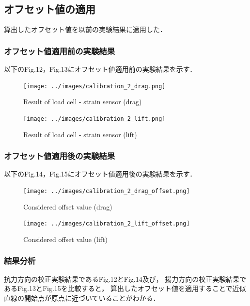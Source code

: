 \documentclass[twocolumn,a4j]{jsarticle}
\begin{document}

\subsection{オフセット値の適用}
算出したオフセット値を以前の実験結果に適用した．\\

\subsubsection*{オフセット値適用前の実験結果}
以下のFig.12，Fig.13にオフセット値適用前の実験結果を示す．
\begin{figure}[htbp]
    \footnotesize
    \begin{center}
        \texttt{[image: ../images/calibration\_2\_drag.png]}
        \caption{Result of load cell - strain sensor (drag)}
        \texttt{[image: ../images/calibration\_2\_lift.png]}
        \caption{Result of load cell - strain sensor (lift)}
    \end{center}
\end{figure}

\newpage

\subsubsection*{オフセット値適用後の実験結果}
以下のFig.14，Fig.15にオフセット値適用後の実験結果を示す．\\
\begin{figure}[htbp]
    \footnotesize
    \begin{center}
        \texttt{[image: ../images/calibration\_2\_drag\_offset.png]}
        \caption{Considered offset value (drag)}
        \texttt{[image: ../images/calibration\_2\_lift\_offset.png]}
        \caption{Considered offset value (lift)}
    \end{center}
\end{figure}

\subsubsection*{結果分析}

抗力方向の校正実験結果であるFig.12とFig.14及び，
揚力方向の校正実験結果であるFig.13とFig.15を比較すると，
算出したオフセット値を適用することで近似直線の開始点が原点に近づいていることがわかる．

\newpage
\end{document}
